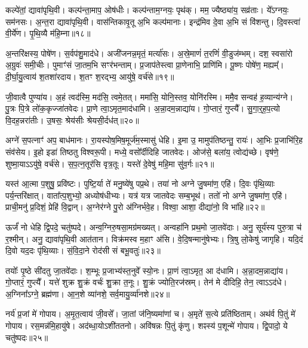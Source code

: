 कल्पे॑तां॒ द्यावा॑पृथि॒वी।
कल्प॑न्ता॒माप॒ ओष॑धीः।
कल्प॑न्ताम॒ग्नयः॒ पृथ॑क्।
मम॒ ज्यैष्ठ्या॑य॒ सव्र॑ताः।
ये᳚ऽग्नयः॒ सम॑नसः।
अ॒न्त॒रा द्यावा॑पृथि॒वी।
वास॑न्तिकावृ॒तू अ॒भि कल्प॑मानाः।
इन्द्र॑मिव दे॒वा अ॒भि सं वि॑शन्तु।
दि॒वस्त्वा॑ वी॒र्ये॑ण।
पृ॒थि॒व्यै म॑हि॒म्ना॥१८॥

अ॒न्तरि॑क्षस्य॒ पोषे॑ण।
स॒र्वप॑शु॒माद॑धे।
अजी॑जनन्न॒मृतं॒ मर्त्या॑सः।
अ॒स्रे॒माणं॑ त॒रणिं॑ वी॒डुज॑म्भम्।
दश॒ स्वसा॑रो अ॒ग्रुवः॑ समी॒चीः।
पुमाꣳ॑सं जा॒तम॒भि सꣳर॑भन्ताम्।
प्र॒जा\-प॑तेस्त्वा प्रा॒णेनाभि॒ प्राणि॑मि।
पू॒ष्णः पोषे॑ण॒ मह्यम्᳚।
दी॒र्घा॒यु॒त्वाय॑ श॒तशा॑रदाय।
श॒तꣳ श॒रद्भ्य॒ आयु॑षे॒ वर्च॑से॥१९॥

जी॒वात्वै पुण्या॑य।
अ॒हं त्वद॑स्मि॒ मद॑सि॒ त्वमे॒तत्।
ममा॑सि॒ योनि॒स्तव॒ योनि॑रस्मि।
ममै॒व सन्वह॑ ह॒व्यान्य॑ग्ने।
पु॒त्रः पि॒त्रे लो॑क॒कृज्जा॑तवेदः।
प्रा॒णे त्वा॒\-ऽमृत॒माद॑धामि।
अ॒न्ना॒दम॒न्नाद्या॑य।
गो॒प्तारं॒ गुप्त्यै᳚।
सु॒गा॒र्॒ह॒प॒त्यो वि॒दह॒न्नरा॑तीः।
उ॒षसः॒ श्रेय॑सीः श्रेयसी॒र्दध॑त्॥२०॥

अग्ने॑ स॒पत्नाꣳ॑ अप॒ बाध॑मानः।
रा॒यस्पोष॒मिष॒मूर्ज॑म॒स्मासु॑ धेहि।
इ॒मा उ॒ मामुप॑तिष्ठन्तु॒ रायः॑।
आ॒भिः प्र॒जाभि॑रि॒ह संव॑सेय।
इ॒हो इडा॑ तिष्ठतु विश्वरू॒पी।
मध्ये॒ वसो᳚र्दीदिहि जातवेदः।
ओज॑से॒ बला॑य॒ त्वोद्य॑च्छे।
वृष॑णे॒ शुष्मा॒या\-ऽऽ\-यु॑षे॒ वर्च॑से।
स॒प॒त्न॒तूर॑सि वृत्र॒तूः।
यस्ते॑ दे॒वेषु॑ महि॒मा सु॑व॒र्गः॥२१॥

यस्त॑ आ॒त्मा प॒शुषु॒ प्रवि॑ष्टः।
पुष्टि॒र्या ते॑ मनु॒ष्ये॑षु पप्र॒थे।
तया॑ नो अग्ने जु॒षमा॑ण॒ एहि॑।
दि॒वः पृ॑थि॒व्याः पर्य॒न्तरि॑क्षात्।
वाता᳚त्प॒शुभ्यो॒ अध्योष॑धीभ्यः।
यत्र॑ यत्र जातवेदः सम्ब॒भूथ॑।
ततो॑ नो अग्ने जु॒षमा॑ण॒ एहि॑।
प्राची॒मनु॑ प्र॒दिशं॒ प्रेहि॑ वि॒द्वान्।
अ॒ग्नेर॑ग्ने पु॒रो अ॑ग्निर्भवे॒ह।
विश्वा॒ आशा॒ दीद्या॑नो॒ वि भा॑हि॥२२॥

ऊर्जं॑ नो धेहि द्वि॒पदे॒ चतु॑ष्पदे।
अन्व॒ग्निरु॒षसा॒मग्र॑मख्यत्।
अन्वहा॑नि प्रथ॒मो जा॒तवे॑दाः।
अनु॒ सूर्य॑स्य पुरु॒त्रा च॑ र॒श्मीन्।
अनु॒ द्यावा॑पृथि॒वी आत॑तान।
विक्र॑मस्व म॒हाꣳ अ॑सि।
वे॒दि॒षन्मानु॑षेभ्यः।
त्रि॒षु लो॒केषु॑ जागृहि।
यदि॒दं दि॒वो यद॒दः पृ॑थि॒व्याः।
सं॒वि॒दा॒ने रोद॑सी सं बभू॒वतुः॑॥२३॥

तयोः᳚ पृ॒ष्ठे सी॑दतु जा॒तवे॑दाः।
श॒म्भूः प्र॒जाभ्य॑स्त॒नुवे᳚ स्यो॒नः।
प्रा॒णं त्वा॒\-ऽमृत॒ आ द॑धामि।
अ॒न्ना॒दम॒न्नाद्या॑य।
गो॒प्तारं॒ गुप्त्यै᳚।
यत्ते॑ शुक्र शु॒क्रं वर्चः॑ शु॒क्रा त॒नूः।
शु॒क्रं ज्योति॒रज॑स्रम्।
तेन॑ मे दीदिहि॒ तेन॒ त्वाऽऽद॑धे।
अ॒ग्निना᳚\-ऽग्ने॒ ब्रह्म॑णा।
आ॒न॒शे व्या॑नशे॒ सर्व॒मायु॒र्व्या॑नशे॥२४॥

नर्य॑ प्र॒जां मे॑ गोपाय।
अ॒मृ॒त॒त्वाय॑ जी॒वसे᳚।
जा॒तां ज॑नि॒ष्यमा॑णां च।
अ॒मृते॑ स॒त्ये प्रति॑\-ष्ठिताम्।
अथ॑र्व पि॒तुं मे॑ गोपाय।
रस॒मन्न॑मि॒हायु॑षे।
अद॑ब्धा॒यो\-ऽशी॑ततनो।
अवि॑षन्नः पि॒तुं कृ॑णु।
शꣴस्य॑ प॒शून्मे॑ गोपाय।
द्वि॒पादो॒ ये चतु॑ष्पदः॥२५॥

